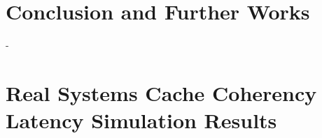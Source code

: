 \documentclass[medieteknikk]{gucmasterthesis}
\begin{document}
\chapter{Conclusion and Further Works}

-



\appendix

\chapter{Real Systems Cache Coherency Latency Simulation Results}
\end{document}
